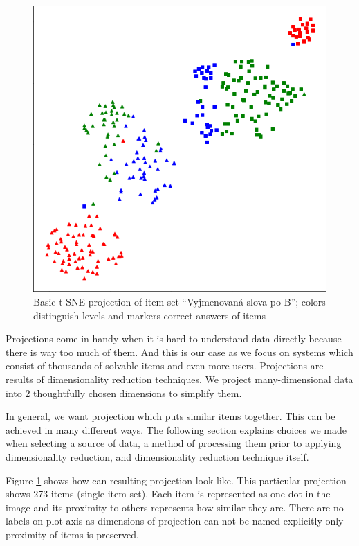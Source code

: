 \documentclass[
  digital, %
  table,   %
  nolof,     %
  nolot,     %
  nocover,
  color
]{fithesis3}
\begin{document}
\begin{figure}
    \includegraphics[width=\textwidth]{img/common_projection}
  \caption{Basic t-SNE projection of item-set ``Vyjmenovaná slova po B''; colors distinguish levels and markers correct answers of items}
  \label{fig:common_projection}
\end{figure}


Projections come in handy when it is hard to understand data directly because there is way too much of them. And this is our case as we focus on systems which consist of thousands of solvable items and even more users. Projections are results of dimensionality reduction techniques. We project many-dimensional data into 2 thoughtfully chosen dimensions to simplify them.


In general, we want projection which puts similar items together. This can be achieved in many different ways. The following section explains choices we made when selecting a source of data, a method of processing them prior to applying dimensionality reduction, and dimensionality reduction technique itself.


Figure \ref{fig:common_projection} shows how can resulting projection look like. This particular projection shows 273 items (single item-set). Each item is represented as one dot in the image and its proximity to others represents how similar they are. There are no labels on plot axis as dimensions of projection can not be named explicitly only proximity of items is preserved.
\end{document}
